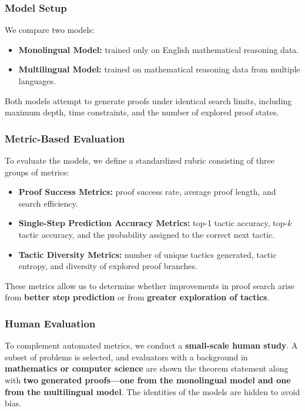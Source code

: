 \documentclass{article} %
\begin{document}
\subsubsection*{Model Setup}

We compare two models:

\begin{itemize}
    \item \textbf{Monolingual Model:} trained only on English mathematical reasoning data.
    \item \textbf{Multilingual Model:} trained on mathematical reasoning data from multiple languages.
\end{itemize}

Both models attempt to generate proofs under identical search limits, including maximum depth, time constraints, and the number of explored proof states.

\subsubsection*{Metric-Based Evaluation}

To evaluate the models, we define a standardized rubric consisting of three groups of metrics:

\begin{itemize}
    \item \textbf{Proof Success Metrics:} proof success rate, average proof length, and search efficiency.
    
    \item \textbf{Single-Step Prediction Accuracy Metrics:} top-1 tactic accuracy, top-$k$ tactic accuracy, and the probability assigned to the correct next tactic.
    
    \item \textbf{Tactic Diversity Metrics:} number of unique tactics generated, tactic entropy, and diversity of explored proof branches.
\end{itemize}

These metrics allow us to determine whether improvements in proof search arise from \textbf{better step prediction} or from \textbf{greater exploration of tactics}.

\subsubsection*{Human Evaluation}

To complement automated metrics, we conduct a \textbf{small-scale human study}. A subset of problems is selected, and evaluators with a background in \textbf{mathematics or computer science} are shown the theorem statement along with \textbf{two generated proofs—one from the monolingual model and one from the multilingual model}. The identities of the models are hidden to avoid bias.
\end{document}
